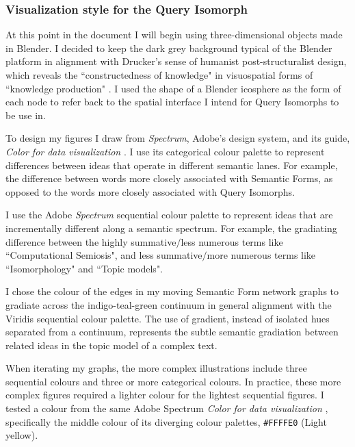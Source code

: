 \subsubsection{Visualization style for the Query Isomorph}
At this point in the document I will begin using three-dimensional objects made in Blender. I decided to keep the dark grey background typical of the Blender platform in alignment with Drucker's sense of humanist post-structuralist design, which reveals the ``constructedness of knowledge" \citep[p. 178]{drucker_graphesis_2014} in visuospatial forms of ``knowledge production" \citep{drucker_graphesis_2014}. I used the shape of a Blender icosphere as the form of each node to refer back to the spatial interface I intend for Query Isomorphs to be use in. 

To design my figures I draw from \textit{Spectrum}, Adobe's design system, and its guide, \textit{Color for data visualization} \citep{adobe_color_2022}. I use its categorical colour palette to represent differences between ideas that operate in different semantic lanes. For example, the difference between words more closely associated with Semantic Forms, as opposed to the words more closely associated with Query Isomorphs.
 
I use the Adobe \textit{Spectrum} sequential colour palette \citep{adobe_color_2022} to represent ideas that are incrementally different along a semantic spectrum. For example, the gradiating difference between the highly summative$/$less numerous terms like ``Computational Semiosis", and less summative$/$more numerous terms like ``Isomorphology" and ``Topic models".  

I chose the colour of the edges in my moving Semantic Form network graphs to gradiate across the indigo-teal-green continuum in general alignment with the Viridis sequential colour palette. The use of gradient, instead of isolated hues separated from a continuum, represents the subtle semantic gradiation between related ideas in the topic model of a complex text. 

When iterating my graphs, the more complex illustrations include three sequential colours and three or more categorical colours. In practice, these more complex figures required a lighter colour for the lightest sequential figures. I tested a colour from the same Adobe Spectrum \textit{Color for data visualization} \citep{adobe_color_2022}, specifically the middle colour of its diverging colour palettes, \texttt{\#FFFFE0} (Light yellow). 

